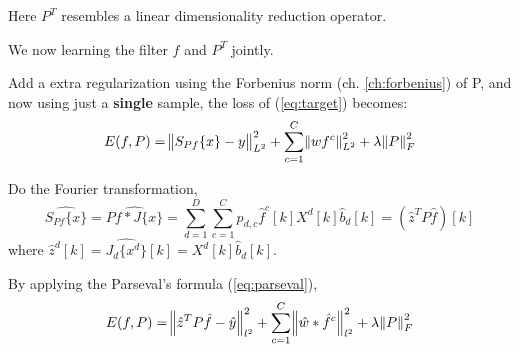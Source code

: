 \documentclass[12pt]{article}
\numberwithin{equation}{section}
\begin{document}
Here $P^T$ resembles a linear dimensionality reduction operator. \par
We now learning the filter $f$ and $P^T$ jointly. \par
Add a extra regularization using the Forbenius norm (ch. \ref{ch:forbenius}) of P, and now using just a \textbf{single} sample, the loss of (\ref{eq:target}) becomes: 
\begin{equation} \label{eq:targetFactorized}
	E(f, P)=\norm{S_{Pf}\{x\}-y}^2_{L^2}
		 + \sum^C_{c=1} \norm{w f^c}^2_{L^2}
		 + \lambda \norm{P}^2_F
\end{equation} \par
Do the Fourier transformation, 
\begin{equation}
	\widehat{S_{Pf}\{x\}} =\widehat{Pf*J\{x\}}
	=\sum^D_{d=1}\sum^C_{c=1}p_{d,c}\hat{f}^c[k]X^d[k]\hat{b}_d[k]
	=(\hat{z}^TP\hat{f})[k]
\end{equation}
where $\hat{z}^d[k]=\widehat{J_d\{x^d\}}[k]=X^d[k]\hat{b}_d[k]$. \par
By applying the Parseval's formula (\ref{eq:parseval}), 
\begin{equation} \label{eq:targetFourierFactorized}
	E(f, P)=\norm{\hat{z}^TP\hat{f}-\hat{y}}^2_{l^2}
		 + \sum^C_{c=1} \norm{\hat{w} * \hat{f}^c}^2_{l^2}
		 + \lambda \norm{P}^2_F
\end{equation} \par
\end{document}

